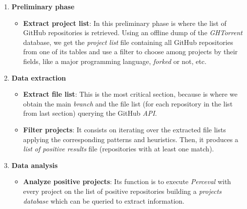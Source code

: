 \documentclass[a4paper, 12pt]{book}
\begin{document}
\begin{enumerate}
  \item \textbf{Preliminary phase}
    \begin{itemize}
      \item \textbf{Extract project list}:
            In this preliminary phase is where the list of GitHub repositories is retrieved. Using an offline dump of
            the \emph{GHTorrent} database, we get the \emph{project list} file containing all GitHub repositories from one of its tables
            and use a filter to choose among projects by their fields, like a major programming language, \textit{forked} or not, etc.
    \end{itemize}
  \item \textbf{Data extraction}
    \begin{itemize}
      \item \textbf{Extract file list}:
            This is the most critical section, because is where we obtain the main \textit{branch} and the file list
            (for each repository in the list from last section) querying the GitHub \textit{API}.
      \item \textbf{Filter projects}:
            It consists on iterating over the extracted file lists applying the corresponding patterns and heuristics.
            Then, it produces a \emph{list of positive results} file (repositories with at least one match).
    \end{itemize}
  \item \textbf{Data analysis}
    \begin{itemize}
      \item \textbf{Analyze positive projects}:
            Its function is to execute \emph{Perceval} with every project on the list of positive repositories
            building a \emph{projects database} which can be queried to extract information.
    \end{itemize}
\end{enumerate}
\end{document}
